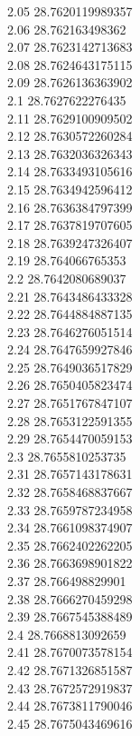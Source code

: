 {2.05	28.7620119989357\\
2.06	28.762163498362\\
2.07	28.7623142713683\\
2.08	28.7624643175115\\
2.09	28.7626136363902\\
2.1	28.7627622276435\\
2.11	28.7629100909502\\
2.12	28.7630572260284\\
2.13	28.7632036326343\\
2.14	28.7633493105616\\
2.15	28.7634942596412\\
2.16	28.7636384797399\\
2.17	28.7637819707605\\
2.18	28.7639247326407\\
2.19	28.764066765353\\
2.2	28.7642080689037\\
2.21	28.7643486433328\\
2.22	28.7644884887135\\
2.23	28.7646276051514\\
2.24	28.7647659927846\\
2.25	28.7649036517829\\
2.26	28.7650405823474\\
2.27	28.7651767847107\\
2.28	28.7653122591355\\
2.29	28.7654470059153\\
2.3	28.7655810253735\\
2.31	28.7657143178631\\
2.32	28.7658468837667\\
2.33	28.7659787234958\\
2.34	28.7661098374907\\
2.35	28.7662402262205\\
2.36	28.7663698901822\\
2.37	28.766498829901\\
2.38	28.7666270459298\\
2.39	28.7667545388489\\
2.4	28.7668813092659\\
2.41	28.7670073578154\\
2.42	28.7671326851587\\
2.43	28.7672572919837\\
2.44	28.7673811790046\\
2.45	28.7675043469616\\
}
